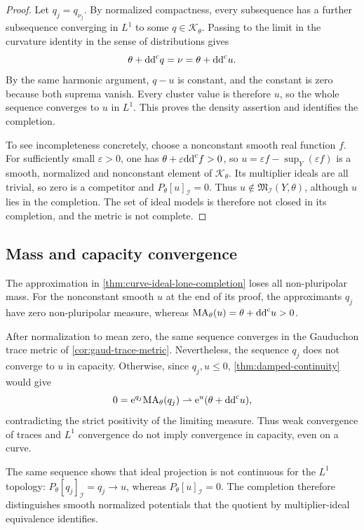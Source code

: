 \begin{proof}
Let $q_j=q_{\nu_j}$. By normalized compactness, every subsequence has a further subsequence converging in $L^1$ to some $q\in\mathcal K_\theta$. Passing to the limit in the curvature identity in the sense of distributions gives
\[
 \theta+\mathrm{dd}^{\mathrm{c}} q=\nu=\theta+\mathrm{dd}^{\mathrm{c}} u.
\]
By the same harmonic argument, $q-u$ is constant, and the constant is zero because both suprema vanish. Every cluster value is therefore $u$, so the whole sequence converges to $u$ in $L^1$. This proves the density assertion and identifies the completion.

To see incompleteness concretely, choose a nonconstant smooth real function $f$. For sufficiently small $\varepsilon>0$, one has $\theta+\varepsilon\mathrm{dd}^{\mathrm{c}} f>0$, so $u=\varepsilon f-\sup_Y(\varepsilon f)$ is a smooth, normalized and nonconstant element of $\mathcal K_\theta$. Its multiplier ideals are all trivial, so zero is a competitor and $P_\theta[u]_{\mathcal I}=0$. Thus $u\notin\mathfrak M_{\mathcal I}(Y,\theta)$, although $u$ lies in the completion. The set of ideal models is therefore not closed in its completion, and the metric is not complete.
\end{proof}

\subsection{Mass and capacity convergence}

The approximation in \cref{thm:curve-ideal-lone-completion} loses all non-pluripolar mass. For the nonconstant smooth $u$ at the end of its proof, the approximants $q_j$ have zero non-pluripolar measure, whereas $\mathrm{MA}_\theta(u)=\theta+\mathrm{dd}^{\mathrm{c}} u>0$.

After normalization to mean zero, the same sequence converges in the Gauduchon trace metric of \cref{cor:gaud-trace-metric}. Nevertheless, the sequence $q_j$ does not converge to $u$ in capacity. Otherwise, since $q_j,u\leq0$, \cref{thm:damped-continuity} would give
\[
 0=\mathrm{e}^{q_j}\mathrm{MA}_\theta(q_j)
   \rightharpoonup\mathrm{e}^{u}(\theta+\mathrm{dd}^{\mathrm{c}} u),
\]
contradicting the strict positivity of the limiting measure. Thus weak convergence of traces and $L^1$ convergence do not imply convergence in capacity, even on a curve.

The same sequence shows that ideal projection is not continuous for the $L^1$ topology: $P_\theta[q_j]_{\mathcal I}=q_j\to u$, whereas $P_\theta[u]_{\mathcal I}=0$. The completion therefore distinguishes smooth normalized potentials that the quotient by multiplier-ideal equivalence identifies.

